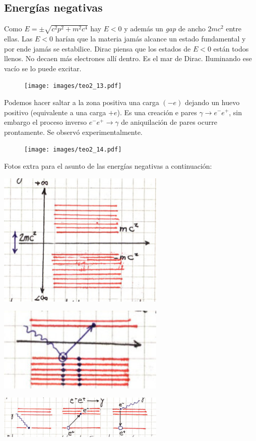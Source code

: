 \documentclass[10pt,oneside]{CBFT_book}
\begin{document}
\subsection{Energías negativas}

Como $E = \pm  \sqrt{ c^2 p^2 + m^2 c^4 } $ hay $E<0$ y además un {\it gap} de ancho $2mc^2$ entre ellas.
Las $E<0$ harían que la materia jamás alcance un estado fundamental y por ende jamás se estabilice.
Dirac piensa que los estados de $E<0$ están todos llenos. No decaen más electrones allí dentro. Es el mar de 
Dirac. Iluminando ese vacío se lo puede excitar.

\begin{figure}[htb]
	\begin{center}
	\texttt{[image: images/teo2\_13.pdf]}
	\end{center}
	\caption{}
\end{figure} 

Podemos hacer saltar a la zona positiva una carga $(-e)$ dejando un huevo positivo (equivalente a una carga 
$+e$). Es una creación e pares $\gamma \to e^-e^+$, sin embargo el proceso inverso $ e^-e^+ \to \gamma$ de 
aniquilación de pares ocurre prontamente.
Se observó experimentalmente.

\begin{figure}[htb]
	\begin{center}
	\texttt{[image: images/teo2\_14.pdf]}
	\end{center}
	\caption{}
\end{figure} 

Fotos extra para el asunto de las energías negativas a continuación:

\includegraphics[width=0.6\textwidth]{images/fig_ft2_energias_negativas_1.jpg}

\includegraphics[width=0.6\textwidth]{images/fig_ft2_energias_negativas_2.jpg}

\includegraphics[width=0.6\textwidth]{images/fig_ft2_energias_negativas_3.jpg}


\end{document}
